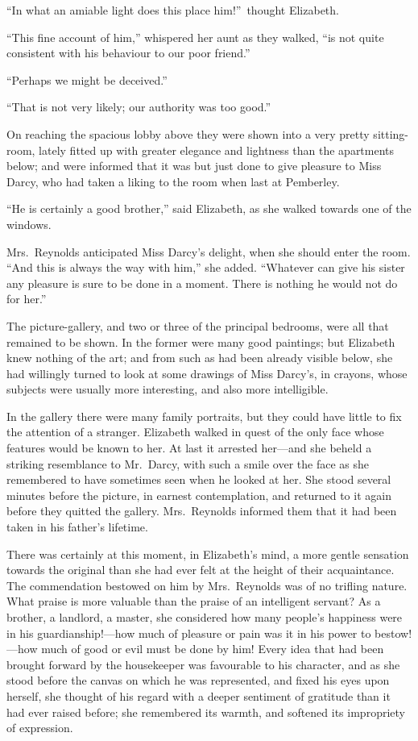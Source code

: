 \documentclass[12pt,english]{book}
\begin{document}
{}``In what an amiable light does this place him!''\ thought Elizabeth.

{}``This fine account of him,'' whispered her aunt as they walked,
{}``is not quite consistent with his behaviour to our poor friend.''

{}``Perhaps we might be deceived.''

{}``That is not very likely; our authority was too good.''

On reaching the spacious lobby above they were shown into a very pretty
sitting-room, lately fitted up with greater elegance and lightness
than the apartments below; and were informed that it was but just
done to give pleasure to Miss Darcy, who had taken a liking to the
room when last at Pemberley.

{}``He is certainly a good brother,'' said Elizabeth, as she walked
towards one of the windows.

Mrs.\ Reynolds anticipated Miss Darcy's delight, when she should
enter the room. {}``And this is always the way with him,'' she added.
{}``Whatever can give his sister any pleasure is sure to be done
in a moment. There is nothing he would not do for her.''

The picture-gallery, and two or three of the principal bedrooms, were
all that remained to be shown. In the former were many good paintings;
but Elizabeth knew nothing of the art; and from such as had been already
visible below, she had willingly turned to look at some drawings of
Miss Darcy's, in crayons, whose subjects were usually more interesting,
and also more intelligible.

In the gallery there were many family portraits, but they could have
little to fix the attention of a stranger. Elizabeth walked in quest
of the only face whose features would be known to her. At last it
arrested her\mbox{---}and she beheld a striking resemblance to Mr.\ Darcy,
with such a smile over the face as she remembered to have sometimes
seen when he looked at her. She stood several minutes before the picture,
in earnest contemplation, and returned to it again before they quitted
the gallery. Mrs.\ Reynolds informed them that it had been taken
in his father's lifetime.

There was certainly at this moment, in Elizabeth's mind, a more gentle
sensation towards the original than she had ever felt at the height
of their acquaintance. The commendation bestowed on him by Mrs.\ Reynolds
was of no trifling nature. What praise is more valuable than the praise
of an intelligent servant? As a brother, a landlord, a master, she
considered how many people's happiness were in his guardianship!\mbox{---}how
much of pleasure or pain was it in his power to bestow!\mbox{---}how
much of good or evil must be done by him! Every idea that had been
brought forward by the housekeeper was favourable to his character,
and as she stood before the canvas on which he was represented, and
fixed his eyes upon herself, she thought of his regard with a deeper
sentiment of gratitude than it had ever raised before; she remembered
its warmth, and softened its impropriety of expression.
\end{document}
